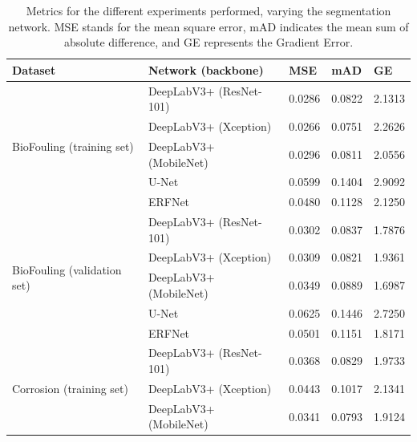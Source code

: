 \documentclass[journal]{IEEEtran}
\begin{document}
\begin{table}[t]
    \centering
    \caption{Metrics for the different experiments performed, varying the segmentation network. MSE stands for the mean square error, mAD indicates the mean sum of absolute difference, and GE represents the Gradient Error.}
    \label{tab:compare_matting_table}
    \begin{tabular}{p{1.5cm}p{5cm}p{2cm}p{2cm}p{2cm}}
        \toprule
        \textbf{Dataset} & \textbf{Network (backbone)}         & \textbf{MSE} & \textbf{mAD} & \textbf{GE} \\
        \midrule %
        \multirow{5}{1.5cm}{BioFouling (training set)}
        & DeepLabV3+ (ResNet-101)             & 0.0286       & 0.0822       & 2.1313                  \\
        & DeepLabV3+ (Xception)               & 0.0266       & 0.0751       & 2.2626                  \\
        & DeepLabV3+ (MobileNet)              & 0.0296       & 0.0811       & 2.0556                  \\
        & U-Net                               & 0.0599       & 0.1404       & 2.9092                  \\
        & ERFNet                              & 0.0480       & 0.1128       & 2.1250                  \\
        \midrule
        \multirow{5}{1.5cm}{BioFouling (validation set)}
        & DeepLabV3+ (ResNet-101)             & 0.0302       & 0.0837       & 1.7876                  \\
        & DeepLabV3+ (Xception)               & 0.0309       & 0.0821       & 1.9361                  \\
        & DeepLabV3+ (MobileNet)              & 0.0349       & 0.0889       & 1.6987                  \\
        & U-Net                               & 0.0625       & 0.1446       & 2.7250                  \\
        & ERFNet                              & 0.0501       & 0.1151       & 1.8171                  \\
        \midrule 
        \multirow{5}{1.5cm}{Corrosion (training set)}
        & DeepLabV3+ (ResNet-101)             & 0.0368       & 0.0829       & 1.9733                  \\
        & DeepLabV3+ (Xception)               & 0.0443       & 0.1017       & 2.1341                  \\
        & DeepLabV3+ (MobileNet)              & 0.0341       & 0.0793       & 1.9124                  \\

\end{tabular}
\end{table}
\end{document}

